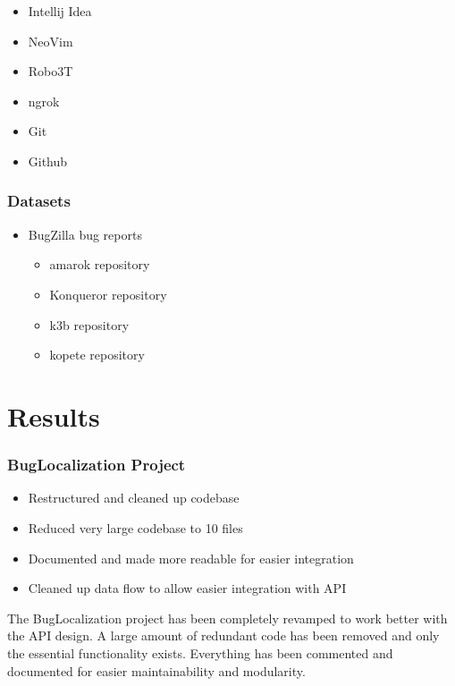 \documentclass[12pt]{article}
\providecommand{\tightlist}{%
  \setlength{\itemsep}{0pt}\setlength{\parskip}{0pt}}
\begin{document}
\begin{itemize}
\tightlist
\item
  Intellij Idea
\item
  NeoVim
\item
  Robo3T
\item
  ngrok
\item
  Git
\item
  Github
\end{itemize}

\hypertarget{datasets}{%
\subsubsection{Datasets}\label{datasets}}

\begin{itemize}
\tightlist
\item
  BugZilla bug reports

  \begin{itemize}
  \tightlist
  \item
    amarok repository
  \item
    Konqueror repository
  \item
    k3b repository
  \item
    kopete repository
  \end{itemize}
\end{itemize}

\hypertarget{results}{%
\section{Results}\label{results}}

\hypertarget{buglocalization-project}{%
\subsubsection{BugLocalization Project}\label{buglocalization-project}}

\begin{itemize}
\tightlist
\item
  Restructured and cleaned up codebase
\item
  Reduced very large codebase to 10 files
\item
  Documented and made more readable for easier integration
\item
  Cleaned up data flow to allow easier integration with API
\end{itemize}

The BugLocalization project has been completely revamped to work better
with the API design. A large amount of redundant code has been removed
and only the essential functionality exists. Everything has been
commented and documented for easier maintainability and modularity.
\end{document}
